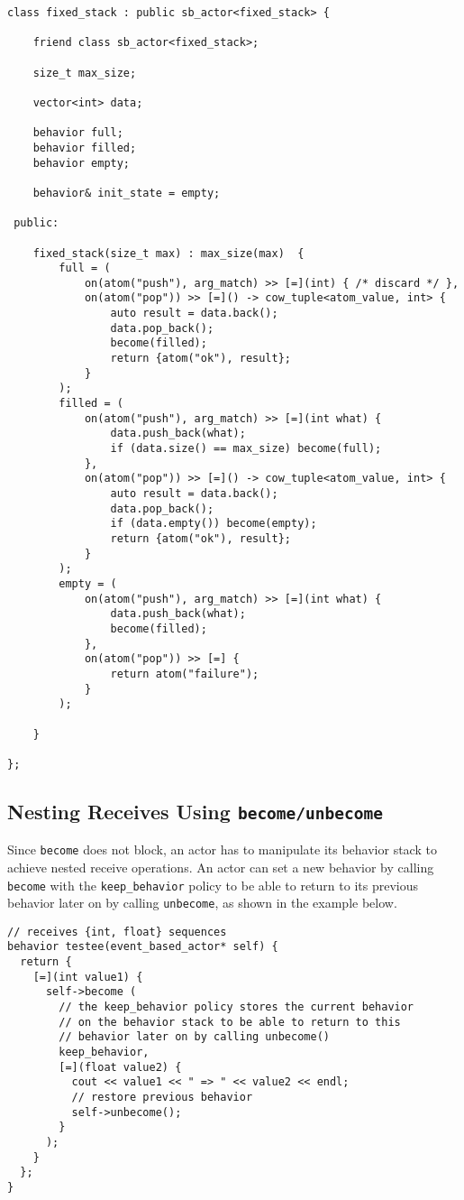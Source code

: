 \clearpage
\begin{lstlisting}
class fixed_stack : public sb_actor<fixed_stack> {

    friend class sb_actor<fixed_stack>;

    size_t max_size;

    vector<int> data;

    behavior full;
    behavior filled;
    behavior empty;

    behavior& init_state = empty;

 public:

    fixed_stack(size_t max) : max_size(max)  {
        full = (
            on(atom("push"), arg_match) >> [=](int) { /* discard */ },
            on(atom("pop")) >> [=]() -> cow_tuple<atom_value, int> {
                auto result = data.back();
                data.pop_back();
                become(filled);
                return {atom("ok"), result};
            }
        );
        filled = (
            on(atom("push"), arg_match) >> [=](int what) {
                data.push_back(what);
                if (data.size() == max_size) become(full);
            },
            on(atom("pop")) >> [=]() -> cow_tuple<atom_value, int> {
                auto result = data.back();
                data.pop_back();
                if (data.empty()) become(empty);
                return {atom("ok"), result};
            }
        );
        empty = (
            on(atom("push"), arg_match) >> [=](int what) {
                data.push_back(what);
                become(filled);
            },
            on(atom("pop")) >> [=] {
                return atom("failure");
            }
        );

    }

};
\end{lstlisting}

\clearpage
\subsection{Nesting Receives Using \lstinline^become/unbecome^}

Since \lstinline^become^ does not block, an actor has to manipulate its behavior stack to achieve nested receive operations.
An actor can set a new behavior by calling \lstinline^become^ with the \lstinline^keep_behavior^ policy to be able to return to its previous behavior later on by calling \lstinline^unbecome^, as shown in the example below.

\begin{lstlisting}
// receives {int, float} sequences
behavior testee(event_based_actor* self) {
  return {
    [=](int value1) {
      self->become (
        // the keep_behavior policy stores the current behavior
        // on the behavior stack to be able to return to this
        // behavior later on by calling unbecome()
        keep_behavior,
        [=](float value2) {
          cout << value1 << " => " << value2 << endl;
          // restore previous behavior
          self->unbecome();
        }
      );
    }
  };
}
\end{lstlisting}

